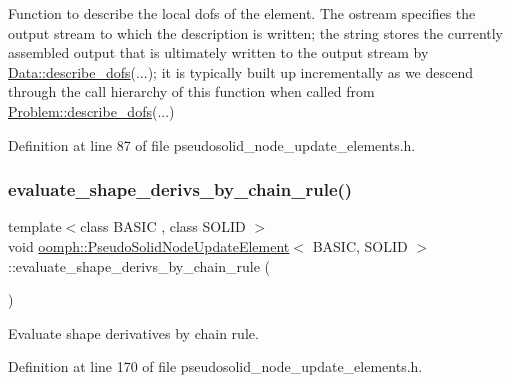 Function to describe the local dofs of the element. The ostream specifies the output stream to which the description is written; the string stores the currently assembled output that is ultimately written to the output stream by \hyperlink{classoomph_1_1Data_a2dae16e2dcff9a40029f834c83364df5}{Data\+::describe\+\_\+dofs}(...); it is typically built up incrementally as we descend through the call hierarchy of this function when called from \hyperlink{classoomph_1_1Problem_abc103804eb319ae0b3d43870cc3e1eaf}{Problem\+::describe\+\_\+dofs}(...) 



Definition at line 87 of file pseudosolid\+\_\+node\+\_\+update\+\_\+elements.\+h.

\mbox{\label{classoomph_1_1PseudoSolidNodeUpdateElement_a9f60c036205aacef2a97aafffb616d85}} 
\subsubsection{\texorpdfstring{evaluate\+\_\+shape\+\_\+derivs\+\_\+by\+\_\+chain\+\_\+rule()}{evaluate\_shape\_derivs\_by\_chain\_rule()}}
{\footnotesize\ttfamily template$<$class B\+A\+S\+IC , class S\+O\+L\+ID $>$ \\
void \hyperlink{classoomph_1_1PseudoSolidNodeUpdateElement}{oomph\+::\+Pseudo\+Solid\+Node\+Update\+Element}$<$ B\+A\+S\+IC, S\+O\+L\+ID $>$\+::evaluate\+\_\+shape\+\_\+derivs\+\_\+by\+\_\+chain\+\_\+rule (\begin{DoxyParamCaption}{ }\end{DoxyParamCaption})\hspace{0.3cm}{\ttfamily [inline]}}



Evaluate shape derivatives by chain rule. 



Definition at line 170 of file pseudosolid\+\_\+node\+\_\+update\+\_\+elements.\+h.

\mbox{\label{classoomph_1_1PseudoSolidNodeUpdateElement_ad35128b838a51f8db6c3d51964b9b00a}} 
